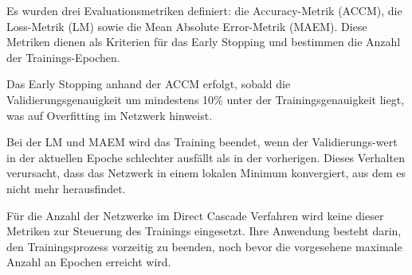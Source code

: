 Es wurden drei Evaluationsmetriken definiert: die Accuracy-Metrik (ACCM), die Loss-Metrik (LM) sowie die Mean Absolute Error-Metrik (MAEM). 
Diese Metriken dienen als Kriterien für das Early Stopping und bestimmen die Anzahl der Trainings-Epochen.

Das Early Stopping anhand der ACCM erfolgt, sobald die Validierungsgenauigkeit um mindestens 10\% unter der 
Trainingsgenauigkeit liegt, was auf Overfitting im Netzwerk hinweist.

Bei der LM und MAEM wird das Training beendet, wenn der Validierungs-wert in der aktuellen Epoche schlechter ausfällt als in der 
vorherigen. Dieses Verhalten verursacht, dass das Netzwerk in einem lokalen Minimum konvergiert, aus dem es nicht mehr herausfindet.

Für die Anzahl der Netzwerke im Direct Cascade Verfahren wird keine dieser Metriken zur Steuerung des Trainings eingesetzt. 
Ihre Anwendung besteht darin, den Trainingsprozess vorzeitig zu beenden, noch bevor die vorgesehene maximale Anzahl an Epochen erreicht wird. 
